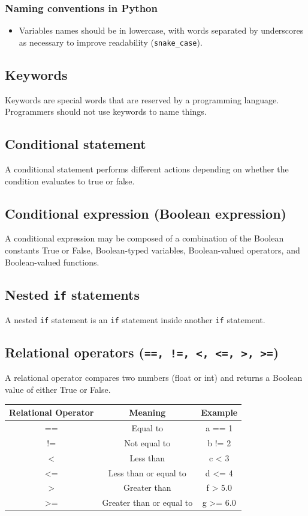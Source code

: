 \documentclass[11pt]{article}
\begin{document}
\subsubsection{Naming conventions in Python}
\label{sec:org6442c4e}
\begin{itemize}
\item Variables names should be in lowercase, with words separated by underscores as necessary to improve readability (\texttt{snake\_case}).
\end{itemize}

\subsection{Keywords}
\label{sec:orgdaa7267}
Keywords are special words that are reserved by a programming language. Programmers should not use keywords to name things.

\subsection{Conditional statement}
\label{sec:org7f44e2d}
A conditional statement performs different actions depending on whether the condition evaluates to true or false.

\subsection{Conditional expression (Boolean expression)}
\label{sec:orga026552}
A conditional expression may be composed of a combination of the Boolean constants True or False, Boolean-typed variables, Boolean-valued operators, and Boolean-valued functions.

\subsection{Nested \texttt{if} statements}
\label{sec:org9986af8}
A nested \texttt{if} statement is an \texttt{if} statement inside another \texttt{if} statement.

\subsection{Relational operators (\texttt{==, !=, <, <=, >, >=})}
\label{sec:org444da0c}
A relational operator compares two numbers (float or int) and returns a Boolean value of either True or False.

\begin{center}
\begin{tabular}{c|c|c}
Relational Operator & Meaning & Example\\[0pt]
\hline
== & Equal to & a == 1\\[0pt]
!= & Not equal to & b != 2\\[0pt]
< & Less than & c < 3\\[0pt]
<= & Less than or equal to & d <= 4\\[0pt]
> & Greater than & f > 5.0\\[0pt]
>= & Greater than or equal to & g >= 6.0\\[0pt]
\end{tabular}
\end{center}
\end{document}
